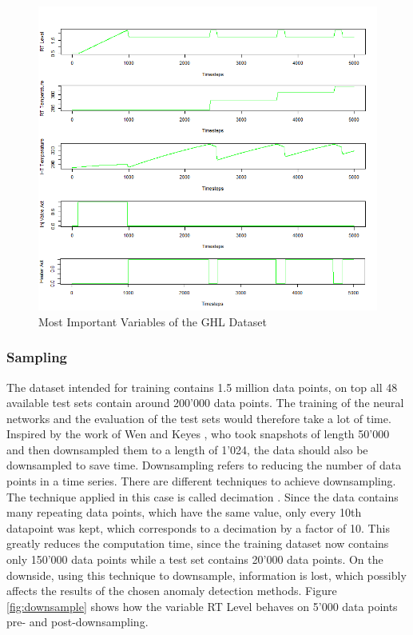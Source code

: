 \begin{figure}[h]
	\centering
	\includegraphics[scale=0.6]{Figures/GHL_data}
	\decoRule
	\caption[GHL: Most Important Variables]{Most Important Variables of the GHL Dataset \parencite{Own}}
	\label{fig:GHL_data}
\end{figure}

\subsubsection{Sampling}
The dataset intended for training contains 1.5 million data points, on top all 48 available test sets contain around 200'000 data points. The training of the neural networks and the evaluation of the test sets would therefore take a lot of time. Inspired by the work of Wen and Keyes \parencite*{Wen2019}, who took snapshots of length 50'000 and then downsampled them to a length of 1'024, the data should also be downsampled to save time. Downsampling  refers to reducing the number of data points in a time series. There are different techniques to achieve downsampling. The technique applied in this case is called decimation \parencite{Tan2018}. Since the data contains many repeating data points, which have the same value, only every 10th datapoint was kept, which corresponds to a decimation by a factor of 10. This greatly reduces the computation time, since the training dataset now contains only 150'000 data points while a test set contains 20'000 data points. On the downside, using this technique to downsample, information is lost, which possibly affects the results of the chosen anomaly detection methods. Figure \ref{fig:downsample} shows how the variable RT Level behaves on 5'000 data points pre- and post-downsampling.

